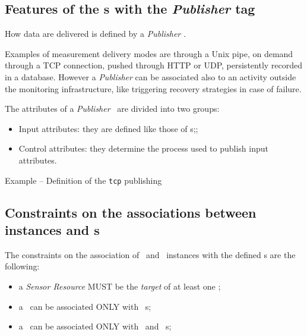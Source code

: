 \documentclass[10pt]{article}  %
\begin{document}

\subsection{Features of the \mi s with the {\em Publisher} tag \label{sec:Publisher}}

How data are delivered is defined by a {\em Publisher} \mi .


Examples of measurement delivery modes are through a Unix pipe, on demand through a TCP connection, pushed through HTTP or UDP, persistently recorded in a database. However a {\em Publisher} can be associated also to an activity outside the monitoring infrastructure, like triggering recovery strategies in case of failure.

The attributes of a {\em Publisher} \mi\ are divided into two groups:

\begin{itemize}
\item Input attributes: they are defined like those of \sens s;;
\item Control attributes: they determine the process used to publish input attributes.
\end{itemize}

\begin{table}
\caption{Example -- Definition of the {\tt \small tcp} publishing \mi } 
\end{table}


\subsection{Constraints on the associations between instances and \mi s}

The constraints on the association of \sens\ and \coll\ instances with the defined \mi s are the following:

\begin{itemize}

\item a {\em Sensor Resource} MUST be the {\em target} of at least one \coll ;

\item a \coll\ can be associated ONLY with \metr\ \mi s;

\item a \sens\ can be associated ONLY with \publ\ and \aggr\ \mi s;

\end{itemize}
\end{document}
